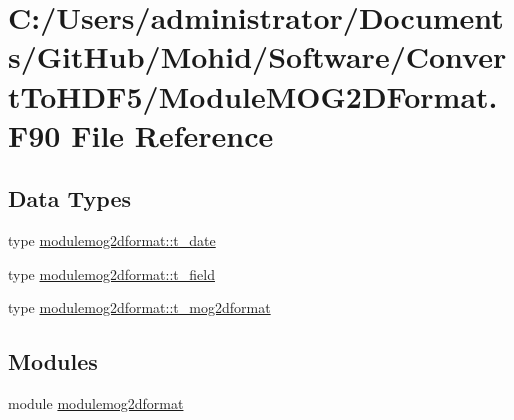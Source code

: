 \hypertarget{_module_m_o_g2_d_format_8_f90}{}\section{C\+:/\+Users/administrator/\+Documents/\+Git\+Hub/\+Mohid/\+Software/\+Convert\+To\+H\+D\+F5/\+Module\+M\+O\+G2\+D\+Format.F90 File Reference}
\label{_module_m_o_g2_d_format_8_f90}
\subsection*{Data Types}
\begin{DoxyCompactItemize}
\item 
type \mbox{\hyperlink{structmodulemog2dformat_1_1t__date}{modulemog2dformat\+::t\+\_\+date}}
\item 
type \mbox{\hyperlink{structmodulemog2dformat_1_1t__field}{modulemog2dformat\+::t\+\_\+field}}
\item 
type \mbox{\hyperlink{structmodulemog2dformat_1_1t__mog2dformat}{modulemog2dformat\+::t\+\_\+mog2dformat}}
\end{DoxyCompactItemize}
\subsection*{Modules}
\begin{DoxyCompactItemize}
\item 
module \mbox{\hyperlink{namespacemodulemog2dformat}{modulemog2dformat}}
\end{DoxyCompactItemize}
